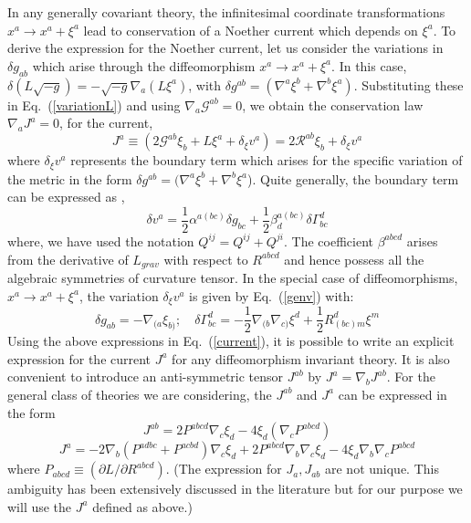 \documentclass[12pt]{iopart}
\def\eq#1{{Eq.~(\ref{#1})}}
\begin{document}
In any generally covariant theory, the infinitesimal coordinate transformations $x^a \to x^a + \xi^a$ lead
to conservation of a Noether current which depends on $\xi^a$. 
To derive the expression for the Noether current, let us consider 
 the variations in $\delta g_{ab}$ which arise through the diffeomorphism $x^a \rightarrow x^a + \xi^a$. In this case, $\delta (L\sqrt{-g} ) = -\sqrt{-g} \nabla_a (L \xi^a)$, with $\delta g^{ab} = (\nabla^a \xi^b + \nabla^b \xi^a)$. Substituting these in \eq{variationL} and using $
\nabla_a \mathcal{G}^{ab} = 0 
$, we obtain the
conservation law $\nabla_a J^a = 0$, for the current,
\begin{equation}
J^a \equiv \left(  2\mathcal{G}^{ab} \xi_b + L\xi^a + \delta_{\xi}v^a \right)
=2\mathcal{R}^{ab} \xi_b+\delta_{\xi}v^a
\label{current}
\end{equation}
where $\delta_{\xi}v^a$ represents the boundary term which arises for the specific variation
of the metric in the form $ \delta g^{ab} = ( \nabla^a \xi^b + \nabla^b \xi^a$). 
Quite generally, the boundary term can be expressed as \cite{mohut},
\begin{equation}
\delta v^a = \frac{1}{2} \alpha ^{a (b c)} \delta g_{ bc} + \frac{1}{2} \beta ^{a (b c)}_{d} \delta \Gamma^{d}_{bc}
\label{genv}
\end{equation}
where, we have used the notation $Q^{i j} = Q^{i j} + Q^{j i}$. The coefficient $\beta ^{a b c d}$ arises from the derivative of $L_{grav}$ with respect to $R^{ a b c d}$ and hence possess all the algebraic symmetries of curvature tensor. 
In the special case of diffeomorphisms, $x^a \rightarrow x^a + \xi^a$, the variation
$\delta_\xi v^a$ is given by \eq{genv} with:
\begin{equation}
\delta g_{a b} = -\nabla_{( a} \xi_{b)}; \quad\delta \Gamma^{d}_{bc} = 
 -\frac{1}{2} \nabla_{(b} \nabla_{c)} \xi^d 
 + \frac{1}{2} R^{d}_{(b c) m} \xi^m
 \label{variations}
\end{equation}
Using the above expressions in \eq{current}, it is possible to write an explicit expression for the current $J^a$ for any diffeomorphism invariant theory.
 It is also convenient to introduce an anti-symmetric tensor $J^{ab}$ by $J^a = \nabla_b J^{ab}$. 
 For the general
class of theories we are considering, the $J^{ab}$ and $J^a$ can be expressed in the form
\begin{equation}
J^{ab} = 2 P^{abcd} \nabla_c \xi_d - 4 \xi_d \left(\nabla_c P^{abcd}\right)
\label{noedef}
\end{equation} 
\begin{equation}
J^a = - 2 \nabla_b \left (P^{adbc} + P^{acbd} \right ) \nabla_c \xi_d + 2 P^{abcd} \nabla_b \nabla_c \xi_d - 4 \xi_d \nabla_b \nabla_c P^{abcd} 
\end{equation} 
where $P_{abcd}\equiv (\partial L/\partial R^{abcd})$.
(The expression for $J_a, J_{ab}$ are  not unique. This ambiguity has been extensively discussed in the literature but for our purpose we will use the $J^a$ defined as above.)
 
\end{document}
